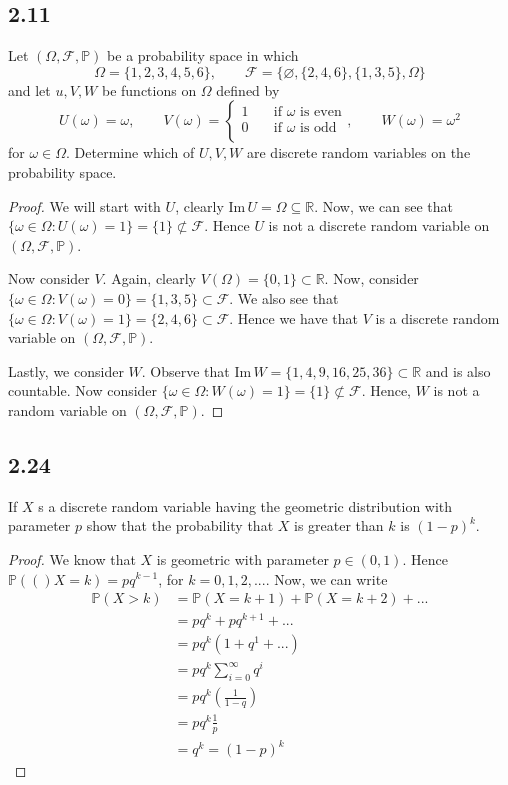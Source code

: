 \documentclass{article}
\newcommand{\R}{\mathbb{R}}
\newcommand{\F}{\mathcal{F}}
\renewcommand{\P}[1]{\mathbb{P}(#1)}
\newcommand{\probspace}{(\Omega, \mathcal{F}, \mathbb{P})}
\newcommand{\Image}[1]{\text{Im}\, #1}
\begin{document}
    \subsection*{2.11}
    Let $\probspace$ be a probability space in which
    $$\Omega = \{1,2,3,4,5,6\}, \qquad \F = \{\varnothing, \{2,4,6\}, \{1,3,5\}, \Omega\}$$
    and let $u, V, W$ be functions on $\Omega$ defined by
    $$U(\omega)= \omega, \qquad V(\omega) = \begin{cases}
        1 \quad &\text{if $\omega$ is even} \\
        0 \quad &\text{if $\omega$ is odd} \\
    \end{cases}, \qquad
    W(\omega)= \omega ^2$$
    for $\omega \in \Omega$. Determine which of $U, V, W$ are discrete random variables
    on the probability space.
    \begin{proof}
        We will start with $U$, clearly $\Image{U} = \Omega \subseteq \R$.
        Now, we can see that $\{\omega \in \Omega: U(\omega) = 1\} = \{1\} \not \subset \F$.
        Hence $U$ is not a discrete random variable on $\probspace$.

        Now consider $V$. Again, clearly $V(\Omega) = \{0,1\} \subset \R$.
        Now, consider $\{\omega \in \Omega: V(\omega)=0\} = \{1,3,5\} \subset \F$. We
        also see that $\{\omega \in \Omega: V(\omega)=1\} = \{2,4,6\} \subset \F$. Hence
        we have that $V$ is a discrete random variable on $\probspace$.

        Lastly, we consider $W$. Observe that $\Image{W} = \{1,4,9,16,25,36\} \subset \R$
        and is also countable. Now consider 
        $\{\omega \in \Omega: W(\omega) = 1\} = \{1\} \not \subset \F$. Hence, $W$ is not
        a random variable on $\probspace$.
    \end{proof}
    \subsection*{2.24}
    If $X$ s a discrete random variable having the geometric distribution with parameter
    $p$ show that the probability that $X$ is greater than $k$ is $(1-p)^k$.
    \begin{proof}
        We know that $X$ is geometric with parameter $p \in (0,1)$. Hence
        $\P(X=k) = pq^{k-1}$, for $k=0,1,2,...$. Now, we can write
        \begin{align*}
            \P{X > k} &= \P{X = k + 1} + \P{X = k + 2} + ... \\
                &= pq^{k} + pq^{k + 1} + ... \\
                &= pq^k(1+q^1 + ...) \\
                &= pq^k \sum_{i = 0}^{\infty}q^i \\
                &= pq^k \left(\frac{1}{1 - q}\right) \\
                &= pq^k\frac{1}{p} \\
                &= q^k = (1-p)^k
        \end{align*}
    \end{proof}
\end{document}
